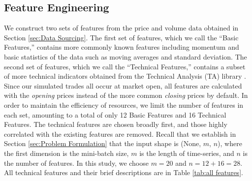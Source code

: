 \documentclass[preprint,12pt,numafflabel,authoryear]{elsarticle}
\begin{document}
\subsection{Feature Engineering}
\label{sec:Feature Engineering}

We construct two sets of features from the price and volume data obtained in Section \ref{sec:Data Sourcing}. The first set of features, which we call the ``Basic Features,'' contains more commonly known features including momentum and basic statistics of the data such as moving averages and standard deviation. The second set of features, which we call the ``Technical Features,'' contains a subset of more technical indicators obtained from the Technical Analysis (TA) library \citep{TALib}. Since our simulated trades all occur at market open, all features are calculated with the \textit{opening} prices instead of the more common \textit{closing} prices by default. In order to maintain the efficiency of resources, we limit the number of features in each set, amounting to a total of only 12 Basic Features and 16 Technical Features. The technical features are chosen broadly first, and those highly correlated with the existing features are removed. Recall that we establish in Section \ref{sec:Problem Formulation} that the input shape is (None, $m$, $n$), where the first dimension is the mini-batch size, $m$ is the length of time-series, and $n$ is the number of features. In this study, we choose $m=20$ and $n=12+16=28$. All technical features and their brief descriptions are in Table \ref{tab:all features}.
\end{document}
